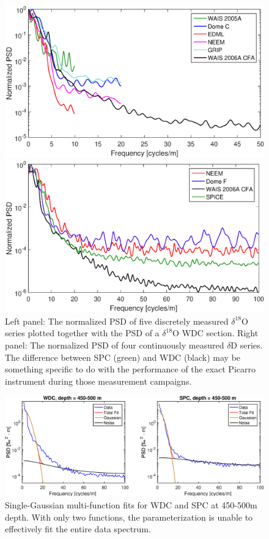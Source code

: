 \documentclass[draft, jgrga]{AGUTeX}
\begin{document}
\begin{figure}[]
	\centering
	\begin{minipage}{.5\textwidth}
		\centering
		\includegraphics[width=0.9\linewidth]{PSD_discrete_plus_cfa_v1.eps}

	\end{minipage}%
	\begin{minipage}{0.5\textwidth}
		\centering
		\indent\includegraphics[width=0.9\linewidth]{PSD_CFA_v1.eps}

	\end{minipage}
	\caption{Left panel: The normalized PSD of five discretely measured $\delta^{18}$O series plotted together with the PSD of a $\delta^{18}$O WDC section. Right panel: The normalized PSD of four continuously measured $\delta$D series. The difference between SPC (green) and WDC (black) may be something specific to do with the performance of the exact Picarro instrument during those measurement campaigns.}
\label{spectra_disVScfa}
\end{figure}

\begin{figure}
	\includegraphics[width=\linewidth]{GR_fits.eps}
	\caption{Single-Gaussian multi-function fits for WDC and SPC at 450-500m depth. With only two functions, the parameterization is unable to effectively fit the entire data spectrum.} \label{GR_fits}
\end{figure}
\end{document}
